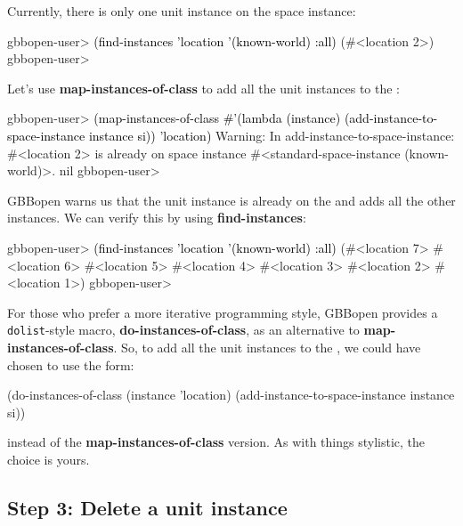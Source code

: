 \documentclass[10pt,twoside,english,pdftex]{article}
\begin{document}
%
%
Currently, there is only one  unit instance on the
 space instance:
%
\W\supp
\begin{example}
\textcolor{darkergray}{%
  gbbopen-user> \textcolor{black}{(find-instances 'location '(known-world) :all)}
  (#<location 2>)
  gbbopen-user>}
\end{example}

Let's use \textbf{map-instances-of-class} to add all the  unit
instances to the :
%
\W\supp
\begin{example}
\textcolor{darkergray}{%
  gbbopen-user> \textcolor{black}{(map-instances-of-class 
                  #'(lambda (instance) 
                       (add-instance-to-space-instance instance si))
                 'location)}
  Warning: In add-instance-to-space-instance: #<location 2> is already on 
           space instance #<standard-space-instance (known-world)>.
  nil
  gbbopen-user>}
\end{example}
%
GBBopen warns us that the   unit instance is already on
the  and adds all the other  instances.  We
can verify this by using \textbf{find-instances}:
%
\W\supp\notpretop
\begin{example}
\textcolor{darkergray}{%
  gbbopen-user> \textcolor{black}{(find-instances 'location '(known-world) :all)}
  (#<location 7> #<location 6> #<location 5> #<location 4> #<location 3>
   #<location 2> #<location 1>)
  gbbopen-user>}
\end{example}

%
For those who prefer a more iterative programming style, GBBopen provides a
\texttt{dolist}-style macro, \textbf{do-instances-of-class}, as an alternative
to \textbf{map-instances-of-class}.  So, to add all the  unit
instances to the , we could have chosen to use the form:
%
\W\supp
\begin{example}
\textcolor{darkergray}{%
  (do-instances-of-class (instance 'location)
     (add-instance-to-space-instance instance si))}
\end{example}
%
instead of the \textbf{map-instances-of-class} version.  As with things
stylistic, the choice is yours.

\subsection*{Step 3: Delete a unit instance}
\end{document}
